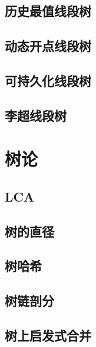 \documentclass[twocolumn,a4]{article}  %
\begin{document}
		\subsection{历史最值线段树}
	 	 	
	 	 	
	 	\subsection{动态开点线段树}
	 	 	
	 	 	
		\subsection{可持久化线段树}
	 	 	
	 	 	
		\subsection{李超线段树}
			
	 	 	
	\section{树论}
		\subsection{LCA}
	 	 	
	 	 	
		\subsection{树的直径}
	 	 	
	 	 	
		\subsection{树哈希}
	 	 	
	 	 	
		\subsection{树链剖分}
	 	 	
	 	 	
		\subsection{树上启发式合并}
	 	 	
	 	 	
\end{document}
